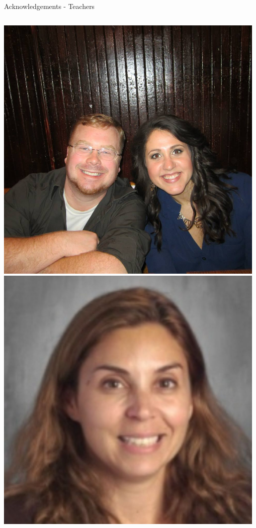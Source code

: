 \documentclass[aspectratio=169]{beamer}
\begin{document}
\begin{frame}{Acknowledgements - Teachers}
\begin{columns}
            \centering
            \includegraphics[width=0.99\textwidth]{people/teachers/kis.png}
            \includegraphics[width=0.99\textwidth]{people/teachers/makos.png}

        \end{columns}   
\end{frame}
\end{document}
